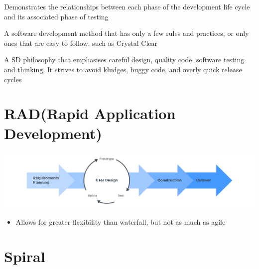 \documentclass{article}[18pt]
\begin{document}
\begin{definition}[V-model]
	Demonstrates the relationships between each phase of the development life cycle and its associated phase of testing 
\end{definition}
\newpage
\begin{definition}[Lightweight]
	A software development method that has only a few rules and practices, or only ones that are easy to follow, such as Crystal Clear
\end{definition}

\begin{definition}
	A SD philosophy that emphasises careful design, quality code, software testing and thinking. It strives to avoid kludges, buggy code, and overly quick release cycles
\end{definition}
\section{RAD(Rapid Application Development)}
\begin{center}
	\includegraphics[scale=0.7]{RAD}
\end{center}
\begin{itemize}
	\item Allows for greater flexibility than waterfall, but not as much as agile
\end{itemize}


\section{Spiral}
\end{document}
